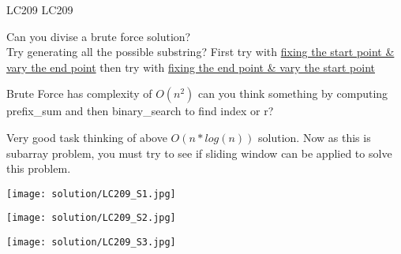 \begin{problem}{LC209}
    LC209
\end{problem}

\begin{guide}
    Can you divise a brute force solution? \\
    Try generating all the possible substring? First try with \underline{fixing the start point \& vary the end point} then try with \underline{fixing the end point \& vary the start point}

    Brute Force has complexity of ${O(n^2)}$ can you think something by computing prefix\_sum and then binary\_search to find index or r?

    Very good task thinking of above $O(n*log(n))$ solution. Now as this is subarray problem, you must try to see if sliding window can be applied to solve this problem.

\end{guide}

\begin{solution}
    
    \texttt{[image: solution/LC209\_S1.jpg]}
\end{solution}

\begin{solution}

    \texttt{[image: solution/LC209\_S2.jpg]}
    
\end{solution}

\begin{solution}
    \texttt{[image: solution/LC209\_S3.jpg]}
    
\end{solution}
